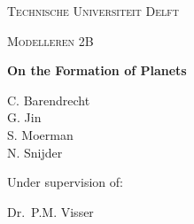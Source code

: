 
\begin{titlepage}
	
	\centering
	{\scshape\Large {\color{white}Technische Universiteit Delft}\par}
	\vspace{1cm}
	{\scshape\Large {\color{white}Modelleren 2B}\par}
	\vspace{1.5cm}
	{\Huge\bfseries {\color{white}On the Formation of Planets}\par}
	\vspace{2cm}
	{\Large{\color{white}
	C. Barendrecht\\ 
	G. Jin\\
	S. Moerman\\
	N. Snijder}\par}
	\vfill
	{\color{white}Under supervision of:\par
	Dr.~P.M. Visser}

	\vfill
\end{titlepage}
\ClearWallPaper
\blankpage
%